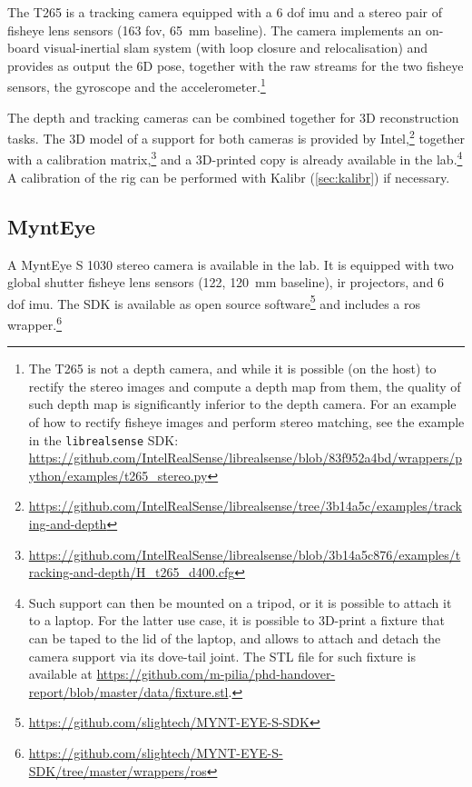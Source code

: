 \documentclass[11pt, letterpaper, twoside]{article}
\begin{document}
The T265 is a tracking camera equipped with a 6 \gls{dof} \gls{imu} and a
stereo pair of fisheye lens sensors (163\textdegree{} \gls{fov}, 65~mm
baseline). The camera implements an on-board visual-inertial \gls{slam} system
(with loop closure and relocalisation) and provides as output the 6D pose,
together with the raw streams for the two fisheye sensors, the gyroscope and
the accelerometer.\footnote{The T265 is not a depth camera, and while it is
    possible (on the host) to rectify the stereo images and compute a depth map
    from them, the quality of such depth map is significantly inferior to the
    depth camera. For an example of how to rectify fisheye images and perform
    stereo matching, see the example in the \texttt{librealsense} SDK:
\url{https://github.com/IntelRealSense/librealsense/blob/83f952a4bd/wrappers/python/examples/t265_stereo.py}}

The depth and tracking cameras can be combined together for 3D reconstruction
tasks. The 3D model of a support for both cameras is provided by
Intel,\footnote{\url{https://github.com/IntelRealSense/librealsense/tree/3b14a5c/examples/tracking-and-depth}}
together with a calibration
matrix,\footnote{\url{https://github.com/IntelRealSense/librealsense/blob/3b14a5c876/examples/tracking-and-depth/H_t265_d400.cfg}}
and a 3D-printed copy is already available in the lab.\footnote{Such support
    can then be mounted on a tripod, or it is possible to attach it to a
    laptop. For the latter use case, it is possible to 3D-print a fixture that
    can be taped to the lid of the laptop, and allows to attach and detach the
    camera support via its dove-tail joint. The STL file for such fixture is
    available at
\url{https://github.com/m-pilia/phd-handover-report/blob/master/data/fixture.stl}.}
A calibration of the rig can be performed with Kalibr (\cref{sec:kalibr}) if
necessary.

\subsection{MyntEye}

A MyntEye S 1030 stereo camera is available in the lab. It is equipped with two
global shutter fisheye lens sensors (122\textdegree{}\textdegree,
120~mm baseline), \gls{ir} projectors, and 6 \gls{dof} \gls{imu}. The SDK is
available as open source
software\footnote{\url{https://github.com/slightech/MYNT-EYE-S-SDK}} and
includes a \gls{ros}
wrapper.\footnote{\url{https://github.com/slightech/MYNT-EYE-S-SDK/tree/master/wrappers/ros}}
\end{document}
